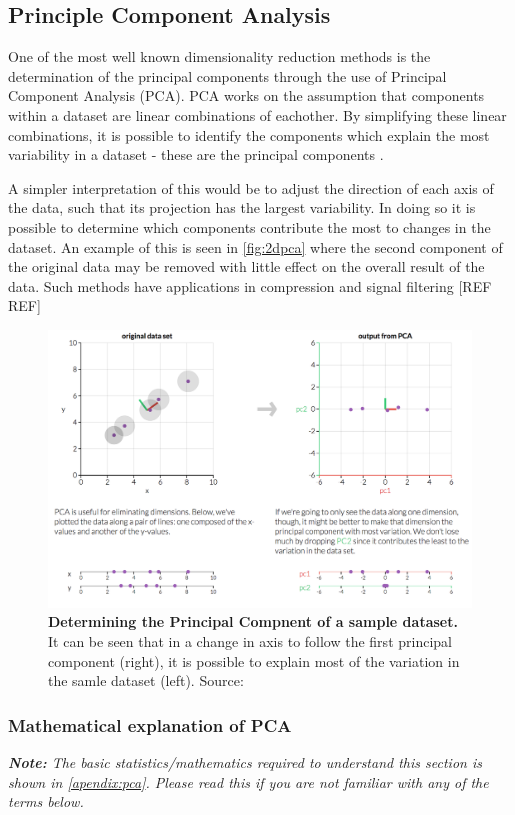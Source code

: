 \subsection{Principle Component Analysis}
One of the most well known dimensionality reduction methods is the determination of the principal components through the use of Principal Component Analysis (PCA). PCA works on the assumption that components within a dataset are linear combinations of eachother. By simplifying these linear combinations, it is possible to identify the components which explain the most variability in a dataset - these are the principal components \citep{pca,pca2}.

A simpler interpretation of this would be to adjust the direction of each axis of the data, such that its projection has the largest variability. In doing so it is possible to determine which components contribute the most to changes in the dataset. An example of this is seen in \autoref{fig:2dpca} where the second component of the original data may be removed with little effect on the overall result of the data. Such methods have applications in compression and signal filtering [REF REF]


\begin{figure}[h]
    \centering
    \includegraphics[width=.8\textwidth]{./4fig/pca2d.png}
    \caption{\textbf{Determining the Principal Compnent of a sample dataset.} It can be seen that in a change in axis to follow the first principal component (right), it is possible to explain most of the variation in the samle dataset (left). Source: \citep{pcaim}}
    \label{fig:2dpca}
\end{figure}


\subsubsection{Mathematical explanation of PCA}
\emph{\textbf{Note:} The basic statistics/mathematics required to understand this section is shown in \autoref{apendix:pca}. Please read this if you are not familiar with any of the terms below.
}

